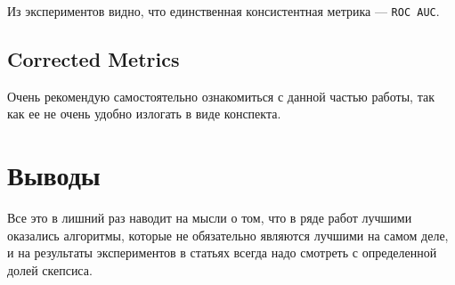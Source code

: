 Из экспериментов видно, что единственная консистентная метрика --- \texttt{ROC AUC}.

\subsection*{Corrected Metrics}

Очень рекомендую самостоятельно ознакомиться с данной частью работы, так как ее не очень удобно излогать в виде конспекта.

\section*{Выводы}


Все это в лишний раз наводит на мысли о том, что в ряде работ лучшими оказались алгоритмы, которые не обязательно являются лучшими на самом деле, и на результаты экспериментов в статьях всегда надо смотреть с определенной долей скепсиса.